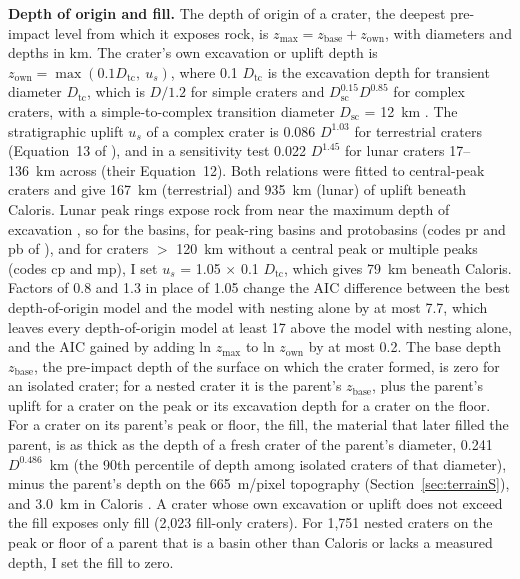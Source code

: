 \documentclass{planetary}
\begin{document}
\textbf{Depth of origin and fill.} The depth of origin of a crater, the deepest pre-impact level from which it exposes rock, is $z_{\max} = z_{\mathrm{base}} + z_{\mathrm{own}}$, with diameters and depths in km. The crater's own excavation or uplift depth is $z_{\mathrm{own}} = \max(0.1 D_{\mathrm{tc}},\ u_s)$, where 0.1 $D_{\mathrm{tc}}$ is the excavation depth for transient diameter $D_{\mathrm{tc}}$, which is $D/1.2$ for simple craters and $D_{\mathrm{sc}}^{0.15} D^{0.85}$ for complex craters, with a simple-to-complex transition diameter $D_{\mathrm{sc}}$ = 12~km \parencite{croft1985,melosh1989}. The stratigraphic uplift $u_s$ of a complex crater is 0.086 $D^{1.03}$ for terrestrial craters (Equation~13 of \cite{cintala1998}), and in a sensitivity test 0.022 $D^{1.45}$ for lunar craters 17--136~km across (their Equation~12). Both relations were fitted to central-peak craters and give 167~km (terrestrial) and 935~km (lunar) of uplift beneath Caloris. Lunar peak rings expose rock from near the maximum depth of excavation \parencite{baker2015,kring2016}, so for the basins, for peak-ring basins and protobasins (codes pr and pb of \textcite{herrick2018}), and for craters $>$ 120~km without a central peak or multiple peaks (codes cp and mp), I set $u_s$ = 1.05 $\times$ 0.1 $D_{\mathrm{tc}}$, which gives 79~km beneath Caloris. Factors of 0.8 and 1.3 in place of 1.05 change the AIC difference between the best depth-of-origin model and the model with nesting alone by at most 7.7, which leaves every depth-of-origin model at least 17 above the model with nesting alone, and the AIC gained by adding ln $z_{\max}$ to ln $z_{\mathrm{own}}$ by at most 0.2. The base depth $z_{\mathrm{base}}$, the pre-impact depth of the surface on which the crater formed, is zero for an isolated crater; for a nested crater it is the parent's $z_{\mathrm{base}}$, plus the parent's uplift for a crater on the peak or its excavation depth for a crater on the floor. For a crater on its parent's peak or floor, the fill, the material that later filled the parent, is as thick as the depth of a fresh crater of the parent's diameter, 0.241 $D^{0.486}$~km (the 90th percentile of depth among isolated craters of that diameter), minus the parent's depth on the 665~m/pixel topography (Section~\ref{sec:terrainS}), and 3.0~km in Caloris \parencite{ernst2015}. A crater whose own excavation or uplift does not exceed the fill exposes only fill (2,023 fill-only craters). For 1,751 nested craters on the peak or floor of a parent that is a basin other than Caloris or lacks a measured depth, I set the fill to zero.
\end{document}
